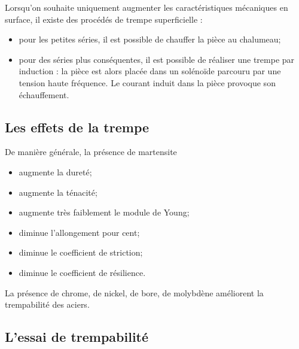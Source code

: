 \documentclass[11pt,oneside]{article}
\begin{document}
Lorsqu'on souhaite uniquement augmenter les caractéristiques mécaniques en surface, il existe des procédés de trempe superficielle : 
\begin{itemize}
\item pour les petites séries, il est possible de chauffer la pièce au chalumeau;
\item pour des séries plus conséquentes, il est possible de réaliser une trempe par induction : la pièce est alors placée dans un solénoïde parcouru par une tension haute fréquence. Le courant induit dans la pièce provoque son échauffement.
\end{itemize}



\subsection{Les effets de la trempe}

De manière générale, la présence de martensite

\begin{minipage}[c]{.45\linewidth}
\begin{itemize}
\item[\ding{51}] augmente la dureté;
\item[\ding{51}] augmente la ténacité;
\item[\ding{51}] augmente très faiblement le module de Young;
\end{itemize}
\end{minipage}\hfill
\begin{minipage}[c]{.45\linewidth}
\begin{itemize}
\item[\ding{55}] diminue l'allongement pour cent;
\item[\ding{55}] diminue le coefficient de striction;
\item[\ding{55}] diminue le coefficient de résilience.
\end{itemize}
\end{minipage}

La présence de chrome, de nickel, de bore, de molybdène améliorent la trempabilité des aciers.

\subsection{L'essai de trempabilité}
\end{document}
